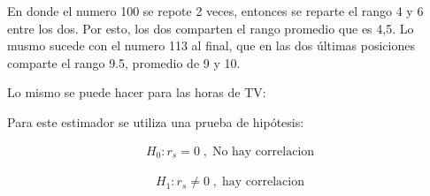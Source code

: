 \documentclass[twocolumn]{article}
\begin{document}
En donde el numero 100 se repote 2 veces, entonces se reparte el rango 4
y 6 entre los dos. Por esto, los dos comparten el rango promedio que es
4,5. Lo musmo sucede con el numero 113 al final, que en las dos últimas
posiciones comparte el rango 9.5, promedio de 9 y 10.

Lo mismo se puede hacer para las horas de TV:

Para este estimador se utiliza una prueba de hipótesis:

\[
\begin{array}{c}
H_0: r_s = 0 \;,\; \text{No hay correlacion}
\end{array}
\]

\[
\begin{array}{c}
H_1: r_s \neq 0 \;,\; \text{hay correlacion}
\end{array}
\]
\end{document}
